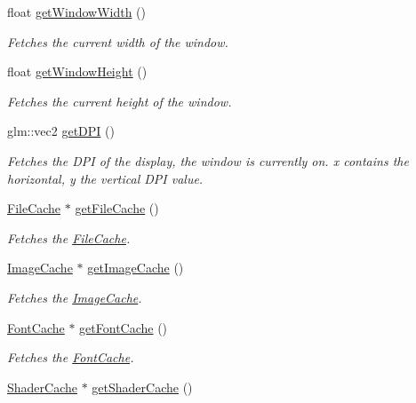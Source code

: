 \begin{DoxyCompactItemize}
float \mbox{\hyperlink{classsage_1_1Application_ac67034adebee2a531f1da502b9ac4634}{get\+Window\+Width}} ()
\begin{DoxyCompactList}\small\item\em Fetches the current width of the window. \end{DoxyCompactList}\item 
float \mbox{\hyperlink{classsage_1_1Application_a20be3d592c9d2662051796420d0cd1d8}{get\+Window\+Height}} ()
\begin{DoxyCompactList}\small\item\em Fetches the current height of the window. \end{DoxyCompactList}\item 
glm\+::vec2 \mbox{\hyperlink{classsage_1_1Application_a452bc916f132e0997a02de53d49364d3}{get\+D\+PI}} ()
\begin{DoxyCompactList}\small\item\em Fetches the D\+PI of the display, the window is currently on. x contains the horizontal, y the vertical D\+PI value. \end{DoxyCompactList}\item 
\mbox{\hyperlink{classsage_1_1FileCache}{File\+Cache}} $\ast$ \mbox{\hyperlink{classsage_1_1Application_a782edaec320c507870814d8576f84fba}{get\+File\+Cache}} ()
\begin{DoxyCompactList}\small\item\em Fetches the \mbox{\hyperlink{classsage_1_1FileCache}{File\+Cache}}. \end{DoxyCompactList}\item 
\mbox{\hyperlink{classsage_1_1ImageCache}{Image\+Cache}} $\ast$ \mbox{\hyperlink{classsage_1_1Application_a3c8156460d822447b22835bc4879c1a1}{get\+Image\+Cache}} ()
\begin{DoxyCompactList}\small\item\em Fetches the \mbox{\hyperlink{classsage_1_1ImageCache}{Image\+Cache}}. \end{DoxyCompactList}\item 
\mbox{\hyperlink{classsage_1_1FontCache}{Font\+Cache}} $\ast$ \mbox{\hyperlink{classsage_1_1Application_a4cd47a4230ba22582b6172ce430feb1d}{get\+Font\+Cache}} ()
\begin{DoxyCompactList}\small\item\em Fetches the \mbox{\hyperlink{classsage_1_1FontCache}{Font\+Cache}}. \end{DoxyCompactList}\item 
\mbox{\hyperlink{classsage_1_1ShaderCache}{Shader\+Cache}} $\ast$ \mbox{\hyperlink{classsage_1_1Application_aa9260bf22da6d4fc5451c789c17ad7a5}{get\+Shader\+Cache}} ()

\end{DoxyCompactItemize}
